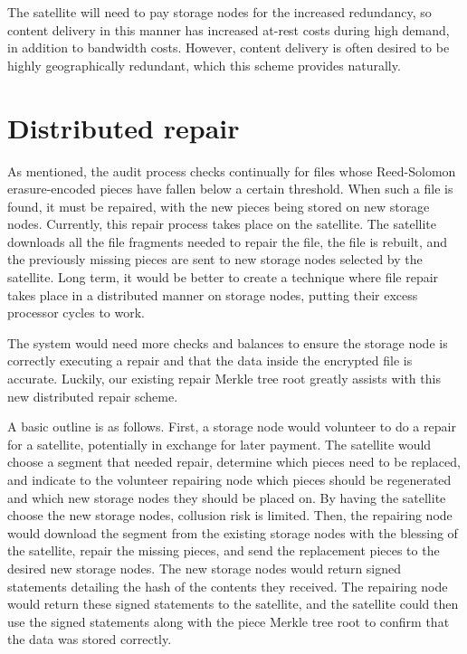 \documentclass[11pt,fleqn,openany]{book}
\begin{document}
The satellite will need to pay storage nodes for the increased redundancy, so
content delivery in this manner has increased at-rest costs during high
demand, in addition to bandwidth costs. However, content delivery is often
desired to be highly geographically redundant, which this scheme provides
naturally.

\section{Distributed repair}\label{sec:future-distributed-repair}

As mentioned, the audit process checks continually for files whose Reed-Solomon
erasure-encoded pieces have fallen below a certain threshold. When such a file
is found, it must be repaired, with
the new pieces being stored on new storage nodes.
Currently, this
repair process takes place on the satellite. The satellite downloads all
the file fragments needed to repair the file, the file is rebuilt, and the
previously missing pieces are sent to new storage nodes
selected by the satellite.
Long term, it would be better to create a technique where file repair takes
place in a distributed manner on storage nodes, putting their excess processor
cycles to work.

The system would need more checks and balances to ensure the storage node is
correctly
executing a repair and that the data inside the encrypted file is accurate.
Luckily, our existing repair Merkle tree root greatly assists with this
new distributed repair scheme.

A basic outline is as follows. First, a storage node would volunteer to do
a repair for a satellite, potentially in exchange for later payment. The
satellite would choose a segment that needed repair, determine which pieces
need to be replaced, and indicate to the volunteer repairing node which
pieces should be regenerated and which new storage nodes they should be placed
on. By having the satellite choose the new storage nodes, collusion risk is
limited. Then, the repairing node would download the segment from the existing
storage nodes with the blessing of the satellite, repair the missing pieces,
and send the replacement pieces to the desired new storage nodes. The new
storage nodes would return signed statements detailing the hash of the contents
they received. The repairing node would return these signed statements to the
satellite, and the satellite could then use the signed statements along with
the piece Merkle tree root to confirm that the data was stored correctly.
\end{document}
